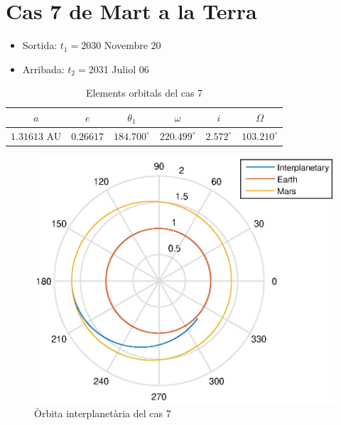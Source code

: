 \section{Cas 7 de Mart a la Terra}
\begin{itemize}
	\item Sortida: $t_{1}=$2030 Novembre 20
	\item Arribada: $t_{2}=$2031 Juliol 06
\end{itemize}
\begin{table}[h!]
	\centering
	\begin{tabular}{ |c|c|c|c|c|c|}
		\hline
		$a$ & $e$ & $\theta_{1}$ & $\omega$ & $i$ & $\Omega$ \\ \hline
		$1.31613$ AU  & $0.26617$ & $184.700^{\circ}$ & $220.499^{\circ}$ & $2.572^{\circ}$ & $103.210^{\circ}$ \\ \hline
	\end{tabular}
	\caption{Elements orbitals del cas 7}
\end{table}
\begin{figure}[H]
	\centering
	\includegraphics[scale=0.95]{./plots/cas7}
	\caption{Òrbita interplanetària del cas 7}
\end{figure}